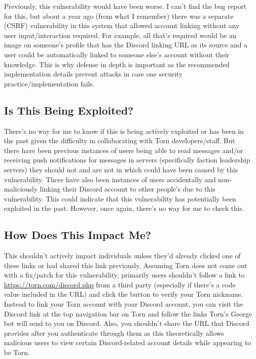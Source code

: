 \documentclass{article}
\begin{document}
{\par{Previously, this vulnerability would have been worse. I can't find the bug report for this, but about a year ago (from what I remember) there was a separate (CSRF) vulnerability in this system that allowed account linking without any user input/interaction required. For example, all that's required would be an image on someone's profile that has the Discord linking URL as its source and a user could be automatically linked to someone else's account without their knowledge. This is why defense in depth is important as the recommended implementation details prevent attacks in case one security practice/implementation fails.}

\subsection{Is This Being Exploited?}
\par{There's no way for me to know if this is being actively exploited or has been in the past given the difficulty in collaborating with Torn developers/staff. But there have been previous instances of users being able to read messages and/or receiving push notifications for messages in servers (specifically faction leadership servers) they should not and are not in which could have been caused by this vulnerability. There have also been instances of users accidentally and non-maliciously linking their Discord account to other people's due to this vulnerability. This could indicate that this vulnerability has potentially been exploited in the past. However, once again, there's no way for me to check this.}

\subsection{How Does This Impact Me?}
\par{This shouldn't actively impact individuals unless they'd already clicked one of these links or had shared this link previously. Assuming Torn does not come out with a fix/patch for this vulnerability, primarily users shouldn't follow a link to \url{https://torn.com/discord.php} from a third party (especially if there's a code value included in the URL) and click the button to verify your Torn nickname. Instead to link your Torn account with your Discord account, you can visit the Discord link at the top navigation bar on Torn and follow the links Torn's George bot will send to you on Discord. Also, you shouldn't share the URL that Discord provides after you authenticate through them as this theoretically allows malicious users to view certain Discord-related account details while appearing to be Torn.}

}
\end{document}
